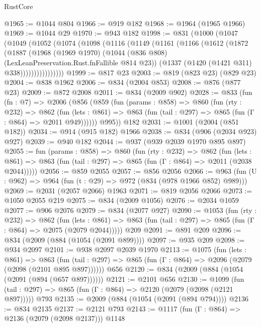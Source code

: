 \begin{lexlean}{RustCore}
\begin{coremodule}
@1965 := @1044 @804
@1966 := @919 @182
@1968 := @1964 (@1965 @1966)
@1969 := @1044 @29
@1970 := @943 @182
@1998 := @831
    (@1000
      (@1047
        (@1049
          (@1052
            (@1074
              (@1098
                (@1116
                  (@1149
                    (@1161
                      (@1166
                        (@1612
                          (@1872
                            (@1887
                              (@1968
                                (@1969 @1970)
                                (@1044 (@836 @808) (LexLeanPreservation.Rust.fnFallible @814 @23))
                                (@1337 (@1420 (@1421 @311) @338))))))))))))))))
@1999 := @817 @23
@2003 := @819 (@823 @23) (@829 @23)
@2004 := @838 @1962
@2006 := @834 (@2004 @853)
@2008 := @876 (@877 @23)
@2009 := @872 @2008
@2011 := @834 (@2009 @902)
@2028 := @833
    (fun (fn : @7) =>
    @2006
      (@856
        (@859
          (fun (params : @858) =>
          @860
            (fun (rty : @232) =>
            @862
              (fun (lets : @861) =>
              @863 (fun (tail : @297) => @865 (fun (Γ : @864) => @2011 @949))))))
        @995))
    @182
@2031 := @1001 (@2004 (@851 @182))
@2034 := @914 (@915 @182) @1966
@2038 := @834 (@906 (@2034 @923) @927)
@2039 := @940 @182
@2044 := @937 (@939 @2039 @1970 @895 @897)
@2055 := fun (params : @858) =>
  @860
    (fun (rty : @232) =>
    @862
      (fun (lets : @861) =>
      @863 (fun (tail : @297) => @865 (fun (Γ : @864) => @2011 (@2038 @2044)))))
@2056 := @859 @2055
@2057 := @856 @2056
@2066 := @963 (fun (U : @962) => @964 (fun (t : @29) => @972 (@834 (@978 @1966 @852) @989)))
@2069 := @2031 (@2057 @2066) @1963
@2071 := @819 @2056 @2066
@2073 := @1050 @2055 @219
@2075 := @834 (@2009 @1056)
@2076 := @2034 @1059
@2077 := @906 @2076
@2079 := @834 (@2077 @927)
@2090 := @1053
    (fun (rty : @232) =>
    @862
      (fun (lets : @861) =>
      @863 (fun (tail : @297) => @865 (fun (Γ : @864) => @2075 (@2079 @2044)))))
    @209
@2091 := @891 @209
@2096 := @834 (@2009 (@884 (@1054 (@2091 @899))))
@2097 := @935 @209
@2098 := @934 @2097
@2101 := @938 @2097 @2039 @1970
@2113 := @1075
    (fun (lets : @861) =>
    @863 (fun (tail : @297) => @865 (fun (Γ : @864) => @2096 (@2079 (@2098 (@2101 @895 @897))))))
    @656
@2120 := @834 (@2009 (@884 (@1054 (@2091 (@894 (@657 @897))))))
@2121 := @2101 @656
@2130 := @1099
    (fun (tail : @297) => @865 (fun (Γ : @864) => @2120 (@2079 (@2098 (@2121 @897)))))
    @793
@2135 := @2009 (@884 (@1054 (@2091 (@894 @794))))
@2136 := @834 @2135
@2137 := @2121 @793
@2143 := @1117 (fun (Γ : @864) => @2136 (@2079 (@2098 @2137))) @1148

\end{coremodule}
\end{lexlean}
